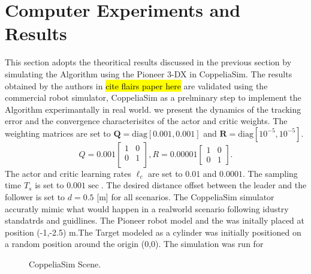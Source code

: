 \documentclass[conference]{IEEEtran}
\begin{document}
 \section{Computer Experiments and Results}
 \label{sec:resultsExperiments}
 This section adopts the theoritical results discussed in the previous section by simulating the Algorithm using the Pioneer 3-DX in CoppeliaSim. The results obtained by the authors in \hl{cite flairs paper here} are validated using the commercial robot simulator, CoppeliaSim as a prelminary step to implement the Algorithm experimantally in real world. we present the dynamics of the tracking error and the convergence characterisitcs of the actor and critic weights. The weighting matrices are set to $\mathbf{Q} = \mathrm{diag}[0.001,0.001]$ and $\mathbf{R} = \mathrm{diag}[10^{-5}, 10^{-5}].$ %
  \[Q=0.001 
  \begin{bmatrix}
  1       & 0   \\
  0       & 1   \\
  \end{bmatrix},
  R=0.00001
  \begin{bmatrix}
  1       & 0 \\
  0       & 1 
  \end{bmatrix}.\]
 The actor and critic learning rates $\ell_c$ are set to  $0.01$ and $0.0001$. The sampling time $T_s$ is set to $0.001 \sec.$ The desired distance offset between the leader and the follower is set to $ d = 0.5$ [m] for all scenarios.
 The CoppeliaSim simulator accuratly mimic what would happen in a realworld scenario following idustry standatrds and guidlines. The Pioneer robot model and the  was initally placed at position (-1,-2.5) m.The Target modeled as a cylinder was initially positioned on a random position around the origin (0,0). The simulation was run for 
\begin{figure}
   \centering
   \caption{CoppeliaSim Scene.}
   \label{fig:CoppeliaSim Scene}
 \end{figure}  
    
\end{document}

